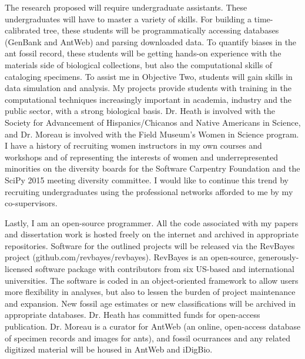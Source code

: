 \documentclass[]{article}
\begin{document}
The research proposed will require undergraduate assistants. These undergraduates will have to master a variety of skills. For building a time-calibrated tree, these students will be programmatically accessing databases (GenBank and AntWeb) and parsing downloaded data. To quantify biases in the ant fossil record, these students will be getting hands-on experience with the materials side of biological collections, but also the computational skills of cataloging specimens. To assist me in Objective Two, students will gain skills in data simulation and analysis. My projects provide students with training in the computational techniques increasingly important in academia, industry and the public sector, with a strong biological basis. Dr. Heath is involved with the Society for Advancement of Hispanics/Chicanos and Native Americans in Science, and Dr. Moreau is involved with the Field Museum's Women in Science program. I have a history of recruiting women instructors in my own courses and workshops and of representing the interests of women and underrepresented minorities on the diversity boards for the Software Carpentry Foundation and the SciPy 2015 meeting diversity committee. I would like to continue this trend by recruiting undergraduates using the professional networks afforded to me by my co-supervisors.\par
Lastly, I am an open-source programmer. All the code associated with my papers and dissertation work is hosted freely on the internet and archived in appropriate repositories. Software for the outlined projects will be released via the RevBayes project (github.com/revbayes/revbayes). RevBayes is an open-source, generously-licensed software package with contributors from six US-based and international universities. The software is coded in an object-oriented framework to allow users more flexibility in analyses, but also to lessen the burden of project maintenance and expansion. New fossil age estimates or new classifications will be archived in appropriate databases. Dr. Heath has committed funds for open-access publication. Dr. Moreau is a curator for AntWeb (an online, open-access database of specimen records and images for ants), and fossil ocurrances and any related digitized material will be housed in AntWeb and iDigBio. \par
	
\end{document}

